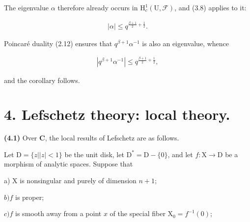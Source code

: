 \documentclass[10pt,leqno]{article}
\begin{document}
\clearpage

\label{physical-16}\par\smallskip

\noindent The eigenvalue \(\alpha \) therefore already occurs in \(\mathrm{H}_{c}^{1}(\mathrm{U},\mathcal{F} )\), and (3.8) applies to it:\par

\begin{equation*}\begin{gathered}|\alpha | \leq  q^{\frac{\beta+1}{2}+\frac{1}{2}}.\end{gathered}\end{equation*}

\noindent Poincaré duality (2.12) ensures that \(q^{\beta +1}\alpha ^{- 1}\) is also an eigenvalue, whence\par

\begin{equation*}\begin{gathered}|q^{\beta +1}\alpha ^{- 1}| \leq  q^{\frac{\beta+1}{2}+\frac{1}{2}},\end{gathered}\end{equation*}

\noindent and the corollary follows.\par

\section*{4. Lefschetz theory: local theory.}

\noindent \textbf{(4.1)} Over \(\mathbf{C}\), the local results of Lefschetz are as follows.\par

\noindent Let \(\mathrm{D}=\{z | |z|<1\}\) be the unit disk, let \(\mathrm{D}^{*}=\mathrm{D}- \{0\}\), and let \(f : \mathrm{X}\longrightarrow \mathrm{D}\) be a morphism of analytic spaces. Suppose that\par

\noindent a) \(\mathrm{X}\) is nonsingular and purely of dimension \(n+1\);\par

\noindent \(b) f\) is proper;\par

\noindent \(c) f\) is smooth away from a point \(x\) of the special fiber \(\mathrm{X}_{0}=f^{- 1}(0)\);\par
\end{document}
